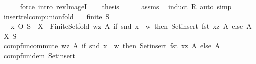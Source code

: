\begin{isabellebody}
\ \ \ \ \isamarkupfalse%
\ {\isacharparenleft}{\kern0pt}force\ intro{\isacharcolon}{\kern0pt}\ rev{\isacharunderscore}{\kern0pt}ImageI{\isacharparenright}{\kern0pt}\isanewline
\ \ \isamarkupfalse%
\ {\isacharquery}{\kern0pt}thesis\isanewline
\ \ \ \ \isamarkupfalse%
\ assms\ \isamarkupfalse%
\ {\isacharparenleft}{\kern0pt}induct\ R{\isacharparenright}{\kern0pt}\ {\isacharparenleft}{\kern0pt}auto\ simp{\isacharcolon}{\kern0pt}\ {\isacharasterisk}{\kern0pt}{\isacharparenright}{\kern0pt}\isanewline
{}\isamarkupfalse%
%
\endisatagproof
{\isafoldproof}%
%
\isadelimproof
\isanewline
%
\endisadelimproof
\isanewline
{}\isamarkupfalse%
\ insert{\isacharunderscore}{\kern0pt}relcomp{\isacharunderscore}{\kern0pt}union{\isacharunderscore}{\kern0pt}fold{\isacharcolon}{\kern0pt}\isanewline
\ \ \ {\isachardoublequoteopen}finite\ S{\isachardoublequoteclose}\isanewline
\ \ \ {\isachardoublequoteopen}{\isacharbraceleft}{\kern0pt}x{\isacharbraceright}{\kern0pt}\ O\ S\ {\isasymunion}\ X\ {\isacharequal}{\kern0pt}\ Finite{\isacharunderscore}{\kern0pt}Set{\isachardot}{\kern0pt}fold\ {\isacharparenleft}{\kern0pt}{\isasymlambda}{\isacharparenleft}{\kern0pt}w{\isacharcomma}{\kern0pt}z{\isacharparenright}{\kern0pt}\ A{\isacharprime}{\kern0pt}{\isachardot}{\kern0pt}\ if\ snd\ x\ {\isacharequal}{\kern0pt}\ w\ then\ Set{\isachardot}{\kern0pt}insert\ {\isacharparenleft}{\kern0pt}fst\ x{\isacharcomma}{\kern0pt}z{\isacharparenright}{\kern0pt}\ A{\isacharprime}{\kern0pt}\ else\ A{\isacharprime}{\kern0pt}{\isacharparenright}{\kern0pt}\ X\ S{\isachardoublequoteclose}\isanewline
%
\isadelimproof
%
\endisadelimproof
%
\isatagproof
{}\isamarkupfalse%
\ {\isacharminus}{\kern0pt}\isanewline
\ \ \isamarkupfalse%
\ comp{\isacharunderscore}{\kern0pt}fun{\isacharunderscore}{\kern0pt}commute\ {\isachardoublequoteopen}{\isasymlambda}{\isacharparenleft}{\kern0pt}w{\isacharcomma}{\kern0pt}z{\isacharparenright}{\kern0pt}\ A{\isacharprime}{\kern0pt}{\isachardot}{\kern0pt}\ if\ snd\ x\ {\isacharequal}{\kern0pt}\ w\ then\ Set{\isachardot}{\kern0pt}insert\ {\isacharparenleft}{\kern0pt}fst\ x{\isacharcomma}{\kern0pt}z{\isacharparenright}{\kern0pt}\ A{\isacharprime}{\kern0pt}\ else\ A{\isacharprime}{\kern0pt}{\isachardoublequoteclose}\isanewline
\ \ \isamarkupfalse%
\ {\isacharminus}{\kern0pt}\isanewline
\ \ \ \ \isamarkupfalse%
\ comp{\isacharunderscore}{\kern0pt}fun{\isacharunderscore}{\kern0pt}idem\ Set{\isachardot}{\kern0pt}insert\isanewline

\end{isabellebody}
